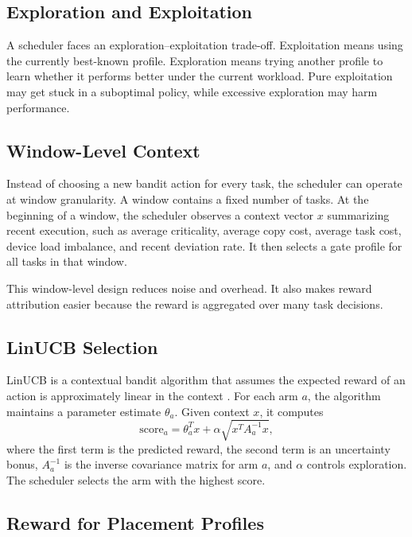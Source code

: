 \subsection{Exploration and Exploitation}
\label{subsec:exploration_exploitation}

A scheduler faces an exploration--exploitation trade-off. Exploitation means using the currently best-known profile. Exploration means trying another profile to learn whether it performs better under the current workload. Pure exploitation may get stuck in a suboptimal policy, while excessive exploration may harm performance.

\subsection{Window-Level Context}
\label{subsec:window_level_context}

Instead of choosing a new bandit action for every task, the scheduler can operate at window granularity. A window contains a fixed number of tasks. At the beginning of a window, the scheduler observes a context vector $x$ summarizing recent execution, such as average criticality, average copy cost, average task cost, device load imbalance, and recent deviation rate. It then selects a gate profile for all tasks in that window.

This window-level design reduces noise and overhead. It also makes reward attribution easier because the reward is aggregated over many task decisions.

\subsection{LinUCB Selection}
\label{subsec:linucb_selection}

LinUCB is a contextual bandit algorithm that assumes the expected reward of an action is approximately linear in the context \cite{Li2010ContextualBandit}. For each arm $a$, the algorithm maintains a parameter estimate $\theta_a$. Given context $x$, it computes
\begin{equation}
\mathrm{score}_a = \theta_a^{T}x + \alpha \sqrt{x^{T}A_a^{-1}x},
\label{eq:linucb_score}
\end{equation}
where the first term is the predicted reward, the second term is an uncertainty bonus, $A_a^{-1}$ is the inverse covariance matrix for arm $a$, and $\alpha$ controls exploration. The scheduler selects the arm with the highest score.

\subsection{Reward for Placement Profiles}
\label{subsec:placement_reward}

